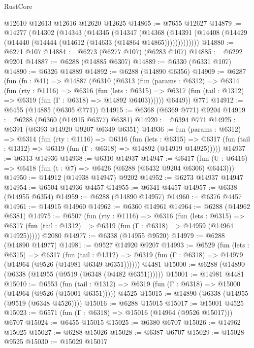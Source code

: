 \begin{lexlean}{RustCore}
\begin{coremodule}
    @12610
    @12613
    @12616
    @12620
    @12625
@14865 := @7655 @12627
@14879 := @14277
    (@14302
      (@14343
        (@14345
          (@14347
            (@14368
              (@14391 (@14408 (@14429 (@14440 (@14444 (@14612 (@14633 (@14864 @14865)))))))))))))
@14880 := @6271 @107
@14884 := @6273 (@6277 @107) (@6283 @107)
@14885 := @6292 @9201
@14887 := @6288 (@14885 @6307)
@14889 := @6330 (@6331 @107)
@14890 := @6326 @14889
@14892 := @6288 (@14890 @6356)
@14909 := @6287
    (fun (fn : @41) =>
    @14887
      (@6310
        (@6313
          (fun (params : @6312) =>
          @6314
            (fun (rty : @1116) =>
            @6316
              (fun (lets : @6315) =>
              @6317 (fun (tail : @1312) => @6319 (fun (Γ : @6318) => @14892 @6403))))))
        @6449))
    @771
@14912 := @6455 (@14885 (@6305 @771))
@14915 := @6368 (@6369 @771) @9204
@14919 := @6288 (@6360 (@14915 @6377) @6381)
@14920 := @6394 @771
@14925 := @6391 (@6393 @14920 @9207 @6349 @6351)
@14936 := fun (params : @6312) =>
  @6314
    (fun (rty : @1116) =>
    @6316
      (fun (lets : @6315) =>
      @6317 (fun (tail : @1312) => @6319 (fun (Γ : @6318) => @14892 (@14919 @14925)))))
@14937 := @6313 @14936
@14938 := @6310 @14937
@14947 := @6417 (fun (U : @6416) => @6418 (fun (t : @7) => @6426 (@6288 (@6432 @9204 @6306) @6443)))
@14950 := @14912 (@14938 @14947) @9202
@14952 := @6273 @14937 @14947
@14954 := @6504 @14936 @4457
@14955 := @6341 @4457
@14957 := @6338 (@14955 @6354)
@14959 := @6288 (@14890 @14957)
@14960 := @6376 @4457
@14961 := @14915 @14960
@14962 := @6360 @14961
@14964 := @6288 (@14962 @6381)
@14975 := @6507
    (fun (rty : @1116) =>
    @6316
      (fun (lets : @6315) =>
      @6317 (fun (tail : @1312) => @6319 (fun (Γ : @6318) => @14959 (@14964 @14925)))))
    @2080
@14977 := @6338 (@14955 @9520)
@14979 := @6288 (@14890 @14977)
@14981 := @9527 @14920 @9207
@14993 := @6529
    (fun (lets : @6315) =>
    @6317
      (fun (tail : @1312) =>
      @6319 (fun (Γ : @6318) => @14979 (@14964 (@9526 (@14981 @6349 @6351))))))
    @4481
@15000 := @6288 (@14890 (@6338 (@14955 (@9519 (@6348 (@4482 @6351))))))
@15001 := @14981 @4481
@15010 := @6553
    (fun (tail : @1312) => @6319 (fun (Γ : @6318) => @15000 (@14964 (@9526 (@15001 @6351)))))
    @4525
@15015 := @14890 (@6338 (@14955 (@9519 (@6348 @4526))))
@15016 := @6288 @15015
@15017 := @15001 @4525
@15023 := @6571 (fun (Γ : @6318) => @15016 (@14964 (@9526 @15017))) @6707
@15024 := @6455 @15015
@15025 := @6380 @6707
@15026 := @14962 @15025
@15027 := @6288 @15026
@15028 := @6387 @6707
@15029 := @15028 @9525
@15030 := @15029 @15017

\end{coremodule}
\end{lexlean}
